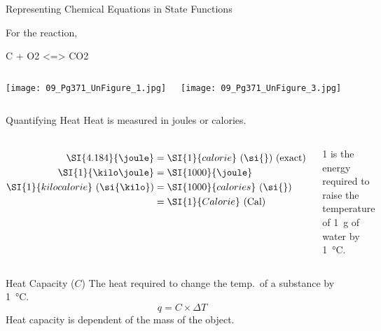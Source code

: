 \documentclass[notes=only]{beamer}
\begin{document}
\begin{frame}{Representing Chemical Equations in State Functions}

	For the reaction,
	\begin{reaction*}
		C\sld[graphite]{} + O2\gas{} <=> CO2\gas{}
	\end{reaction*}

	\bigskip

	\begin{columns}


	\begin{center}
		\texttt{[image: 09\_Pg371\_UnFigure\_1.jpg]}
	\end{center}

	
	\begin{center}
		\texttt{[image: 09\_Pg371\_UnFigure\_3.jpg]}
	\end{center}
\end{columns}
\end{frame}

\begin{frame}{Quantifying Heat}
	Heat is measured in \alert{joules} or \alert{calories}.
	\begin{columns}
		\begin{align*}
			\SI{4.184}{\joule} &= \SI{1}{calorie}~\text{(\si{\cal})
			(exact)}
			\\
			\SI{1}{\kilo\joule} &= \SI{1000}{\joule} \\
			\SI{1}{kilocalorie}~\text{(\si{\kilo\cal})} &=
			\SI{1000}{calories}~\text{(\si{\cal})} \\
			&= \SI{1}{Calorie}~\text{(Cal)}
		\end{align*}
		\begin{framed}
		\SI{1}{\cal} is the energy required to raise the temperature of
		\SI{1}{\gram} of water by \SI{1}{\celsius}.
		\end{framed}
	\end{columns}

	\pause

	\begin{block}{Heat Capacity ($C$)}
	The heat required to change the temp.\ of a substance by
	\SI{1}{\celsius}.
	\begin{equation*}
		q = C \times \Delta T
	\end{equation*}
	Heat capacity is \alert{dependent} of the mass of the object.
\end{block}
\end{frame}
\end{document}
